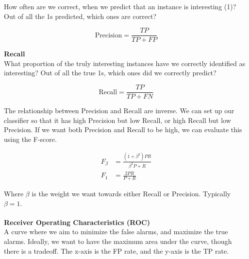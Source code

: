 \documentclass[a4paper,10pt]{article}
\begin{document}
How often are we correct, when we predict that an instance is interesting (1)? Out of all the 1s predicted, which ones are correct? 
\begin{shaded}
	\begin{equation*}
		\text{Precision} = \frac{TP}{TP + FP}
	\end{equation*}
\end{shaded}
\noindent \textcolor{Periwinkle}{\textbf{Recall}}\\
What proportion of the truly interesting instances have we correctly identified as interesting? Out of all the true 1s, which ones did we correctly predict? 
\begin{shaded}
	\begin{equation*}
		\text{Recall} = \frac{TP}{TP + FN}
	\end{equation*}
\end{shaded}
\noindent The relationship between Precision and Recall are inverse. We can set up our classifier so that it has high Precision but low Recall, or high Recall but low Precision. 
\newpage
\noindent If we want both Precision and Recall to be high, we can evaluate this using the F-score. 
\begin{shaded}
	\begin{align*}
		F_{\beta} &= \frac{(1 + \beta^{2})PR}{\beta^{2}P + R} \\
		F_{1} &= \frac{2PR}{P + R}
	\end{align*}
\end{shaded}
\noindent Where $\beta$ is the weight we want towards either Recall or Precision. Typically $\beta = 1$. \\\\
\textcolor{Periwinkle}{\textbf{Receiver Operating Characteristics (ROC)}}\\
A curve where we aim to minimize the false alarms, and maximize the true alarms. Ideally, we want to have the maximum area under the curve, though there is a tradeoff. The x-axis is the FP rate, and the y-axis is the TP rate. 
\end{document}

